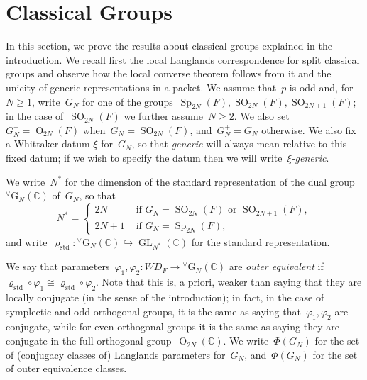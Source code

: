 \documentclass[12pt]{amsart}
\newcommand{\BC}{\mathbb {C}}
\newcommand{\GL}{\operatorname{GL}}
\newcommand{\OO}{\operatorname{O}}
\newcommand{\SO}{\operatorname{SO}}
\newcommand{\G}{\mathrm{G}}
\newcommand{\Sp}{\operatorname{Sp}}
\newcommand{\WD}{{WD}}
\def\rhostd{\varrho_{\mathrm{std}}} %
\def\vG{{}^\vee\G}
\begin{document}
\section{Classical Groups}\label{classicalgroupssection}
In this section, we prove the results about classical groups explained in the introduction. We recall first the local Langlands correspondence for split classical groups and observe how the local converse theorem follows from it and the unicity of generic representations in a packet. We assume that~$p$ is odd and, for~$N\ge 1$, write~$G_N$ for one of the groups~$\Sp_{2N}(F),\SO_{2N}(F),\SO_{2N+1}(F)$; in the case of~$\SO_{2N}(F)$ we further assume~$N\ge 2$. We also set~$G_N^+=\OO_{2N}(F)$ when~$G_N=\SO_{2N}(F)$, and~$G_N^+=G_N$ otherwise. We also fix a Whittaker datum $\xi$ for~$G_N$, so that \emph{generic} will always mean relative to this fixed datum; if we wish to specify the datum then we will write~\emph{$\xi$-generic}.

We write~$N^*$ for the dimension of the standard representation of the dual group~$\vG_N(\BC)$ of~$G_N$, so that
\[
N^*=\begin{cases} 2N &\text{ if }G_N=\SO_{2N}(F)\text{ or }\SO_{2N+1}(F), \\
2N+1 &\text{ if }G_N=\Sp_{2N}(F), \end{cases}
\]
and write~$\rhostd:\vG_N(\BC)\hookrightarrow \GL_{N^*}(\BC)$ for the standard representation.

We say that parameters~$\varphi_1,\varphi_2:\WD_F\to\vG_N(\BC)$ are \emph{outer equivalent} if~$\rhostd\circ\varphi_1\cong\rhostd\circ\varphi_2$. Note that this is, a priori, weaker than saying that they are locally conjugate (in the sense of the introduction); in fact, in the case of symplectic and odd orthogonal groups, it is the same as saying that~$\varphi_1,\varphi_2$ are conjugate, while for even orthogonal groups it is the same as saying they are conjugate in the full orthogonal group~$\OO_{2N}(\BC)$.
We write~$\Phi(G_N)$ for the set of (conjugacy classes of) Langlands parameters for~$G_N$, and~$\overline\Phi(G_N)$ for the set of outer equivalence classes. 
\end{document}
